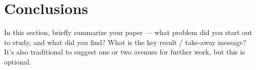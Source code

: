 
\section{Conclusions}
\label{sec:concl}

In this section, briefly summarize your paper --- what problem did you
start out to study, and what did you find? What is the key result /
take-away message? It's also traditional to suggest one or two avenues
for further work, but this is optional.
